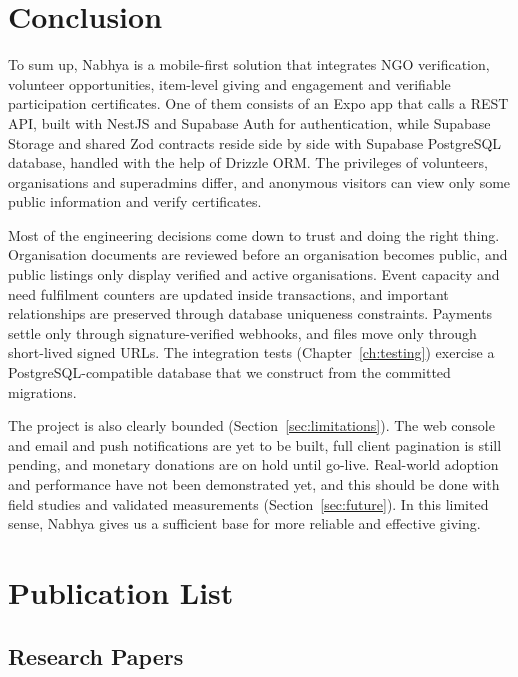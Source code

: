 \chapter{Conclusion}
\label{ch:conclusion}

To sum up, Nabhya is a mobile-first solution that integrates NGO verification, volunteer opportunities, item-level giving and engagement and verifiable participation certificates. One of them consists of an Expo app that calls a REST API, built with NestJS and Supabase Auth for authentication, while Supabase Storage and shared Zod contracts reside side by side with Supabase PostgreSQL database, handled with the help of Drizzle ORM. The privileges of volunteers, organisations and superadmins differ, and anonymous visitors can view only some public information and verify certificates.

\noindent \newline Most of the engineering decisions come down to trust and doing the right thing. Organisation documents are reviewed before an organisation becomes public, and public listings only display verified and active organisations. Event capacity and need fulfilment counters are updated inside transactions, and important relationships are preserved through database uniqueness constraints. Payments settle only through signature-verified webhooks, and files move only through short-lived signed URLs. The integration tests (Chapter~\ref{ch:testing}) exercise a PostgreSQL-compatible database that we construct from the committed migrations.

\noindent \newline  The project is also clearly bounded (Section~\ref{sec:limitations}). The web console and email and push notifications are yet to be built, full client pagination is still pending, and monetary donations are on hold until go-live. Real-world adoption and performance have not been demonstrated yet, and this should be done with field studies and validated measurements (Section~\ref{sec:future}). In this limited sense, Nabhya gives us a sufficient base for more reliable and effective giving.

\chapter{Publication List}
\label{ch:publications}

\section{Research Papers}

